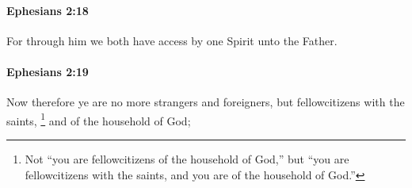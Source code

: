 		\paragraph{Ephesians 2:18} %
			\label{EPHESIANS-2-18}

			For through him we both have access by one Spirit unto the Father.

			\begin{framed}
			\scriptsize
				\begin{compactdesc}
					\item[SBLG] 
				\end{compactdesc}
			\end{framed}

		\paragraph{Ephesians 2:19} %
			\label{EPHESIANS-2-19}

			Now therefore ye are no more strangers and foreigners, but fellowcitizens with the saints,
				\footnote{%
					Not ``you are fellowcitizens of the household of God,'' but ``you are fellowcitizens with the saints, and you are of the household of God.''
					}
			and of the household of God;

